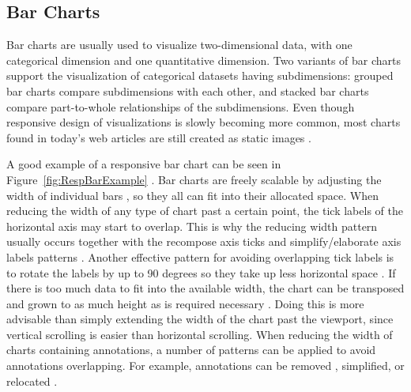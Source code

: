 \subsection{Bar Charts}
\label{sec:BarChartExamples}

Bar charts are usually used to visualize two-dimensional data, with
one categorical dimension and one quantitative dimension. Two variants
of bar charts support the visualization of categorical datasets having
subdimensions: grouped bar charts \parencite{GroupedBar} compare
subdimensions with each other, and stacked bar charts
\parencite{StackedBar} compare part-to-whole relationships of the
subdimensions. Even though responsive design of visualizations is
slowly becoming more common, most charts found in today's web articles
are still created as static images
\parencite{HBar,VBar,HVBar,MapBarLine}.

A good example of a responsive bar chart can be seen in
Figure~\ref{fig:RespBarExample} \parencite{RespVis}. Bar charts are
freely scalable by adjusting the width of individual bars
\parencite{RespHBar,RespHBarHLine,RespHBars}, so they all can fit into
their allocated space. When reducing the width of any type of chart
past a certain point, the tick labels of the horizontal axis may start
to overlap. This is why the reducing width pattern usually occurs
together with the recompose axis ticks and simplify/elaborate axis
labels patterns \parencite{RespHBars,RespHBarHLine,RespVBar}. Another
effective pattern for avoiding overlapping tick labels is to rotate
the labels by up to 90 degrees so they take up less horizontal space
\parencite{RespVis}. If there is too much data to fit into the
available width, the chart can be transposed and grown to as much
height as is required necessary \parencite{RespVis}. Doing this is
more advisable than simply extending the width of the chart past the
viewport, since vertical scrolling is easier than horizontal
scrolling. When reducing the width of charts containing annotations, a
number of patterns can be applied to avoid annotations
overlapping. For example, annotations can be removed
\parencite{RespHStackedBar,RespHLineHStackedBar}, simplified, or
relocated \parencite{RespVBar}.



